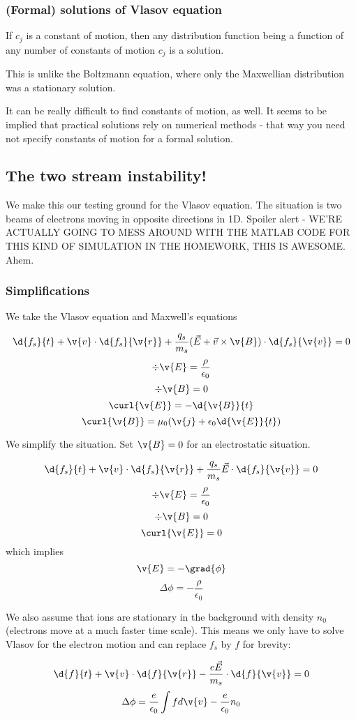 \documentclass[PlasmaNotes.tex]{subfiles}
\begin{document}
\subsubsection{(Formal) solutions of Vlasov equation}
If $c_j$ is a constant of motion, then any distribution function being a function of any number of constants of motion $c_j$  is a solution.

This is unlike the Boltzmann equation, where only the Maxwellian distribution was a stationary solution.

It can be really difficult to find constants of motion, as well. It seems to be implied that practical solutions rely on numerical methods - that way you need not specify constants of motion for a formal solution.

\subsection{The two stream instability!}
We make this our testing ground for the Vlasov equation. The situation is two beams of electrons moving in opposite directions in 1D. Spoiler alert - WE'RE ACTUALLY GOING TO MESS AROUND WITH THE MATLAB CODE FOR THIS KIND OF SIMULATION IN THE HOMEWORK, THIS IS AWESOME. Ahem.
\subsubsection{Simplifications}
We take the Vlasov equation and Maxwell's equations

\[\d{f_s}{t} + \v{v} \cdot \d{f_s}{\v{r}} + \frac{q_s}{m_s} (\vec{E} + \vec{v} \times \v{B}) \cdot \d{f_s}{\v{v}} = 0\]
\[ \div{\v{E}} = \frac{\rho}{\epsilon_0} \]
\[ \div{\v{B}} = 0 \]
\[ \curl{\v{E}} = -\d{\v{B}}{t} \]
\[ \curl{\v{B}} = \mu_0 ( \v{j} + \epsilon_0 \d{\v{E}}{t}) \]

We simplify the situation. Set $\v{B} = 0$ for an electrostatic situation.

\[\d{f_s}{t} + \v{v} \cdot \d{f_s}{\v{r}} + \frac{q_s}{m_s} \vec{E} \cdot \d{f_s}{\v{v}} = 0\]
\[ \div{\v{E}} = \frac{\rho}{\epsilon_0} \]
\[ \div{\v{B}} = 0 \]
\[ \curl{\v{E}} = 0 \]
which implies
\[\v{E} = -\grad{\phi}\]
\[\Delta\phi = -\frac{\rho}{\epsilon_0} \]

We also assume that ions are stationary in the background with density $n_0$ (electrons move at a much faster time scale). This means we only have to solve Vlasov for the electron motion and can replace $f_s$ by $f$ for brevity:

\[\d{f}{t} + \v{v} \cdot \d{f}{\v{r}} - \frac{e \vec{E}}{m_s} \cdot \d{f}{\v{v}} = 0\]
\[\Delta\phi = \frac{e}{\epsilon_0} \int f d\v{v} - \frac{e}{\epsilon_0} n_0\]
\end{document}
